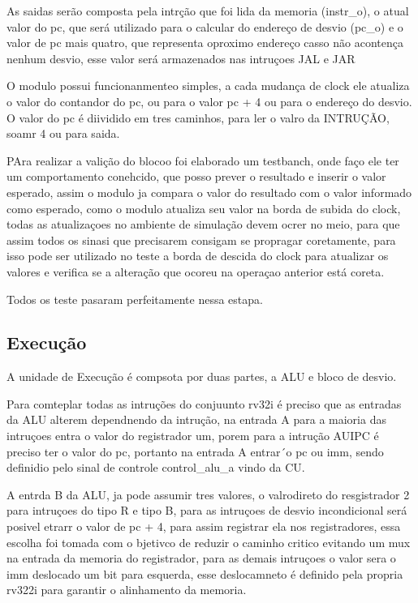 As saidas serão composta pela intrção que foi lida da memoria (instr_o), o atual valor do pc, que será utilizado para o calcular do endereço de desvio (pc_o) e o valor de pc mais quatro, que representa  oproximo endereço casso não acontença nenhum desvio, esse valor será armazenados nas intruçoes JAL e JAR

O modulo possui funcionanmenteo simples, a cada mudança de clock ele atualiza o valor do contandor do pc, ou para o valor pc + 4 ou para o endereço do desvio. O valor do pc é diividido em tres caminhos, para ler o valro da INTRUÇÃO, soamr 4 ou para saida.

PAra realizar a valição do blocoo foi elaborado um testbanch, onde faço ele ter um comportamento conehcido, que posso prever o resultado e inserir o valor esperado, assim o modulo ja compara o valor do resultado com o valor informado como esperado, como o modulo atualiza seu valor na borda de subida do clock, todas as atualizaçoes no ambiente de simulação devem ocrer no meio, para que assim todos os sinasi que precisarem consigam se propragar coretamente, para isso pode ser utilizado no teste a borda de descida do clock para atualizar os valores e verifica se a alteração que ocoreu na operaçao anterior está coreta.

Todos os teste pasaram perfeitamente nessa estapa.

\subsection{Execução}
\label{sub:executar}

A unidade de Execução é compsota por duas partes, a ALU e bloco de desvio.

Para comteplar todas as intruções do conjuunto rv32i é preciso que as entradas da ALU alterem dependnendo da intrução, na entrada A para a maioria das intruçoes entra o valor do registrador um, porem para a intrução AUIPC é preciso ter o valor do pc, portanto na entrada A entrar´o pc ou imm, sendo definidio pelo sinal de controle control_alu_a vindo da CU.

A entrda B da ALU, ja pode assumir tres valores, o valrodireto do resgistrador 2 para intruçoes do tipo R e tipo B, para as intruçoes de desvio incondicional será posivel etrarr o valor de pc + 4, para assim registrar ela nos registradores, essa escolha foi tomada com o bjetivco de reduzir o caminho critico evitando um mux na entrada da memoria do registrador, para as demais intruçoes o valor sera o imm deslocado um bit para esquerda, esse deslocamneto é definido pela propria rv322i para garantir o alinhamento da memoria.

